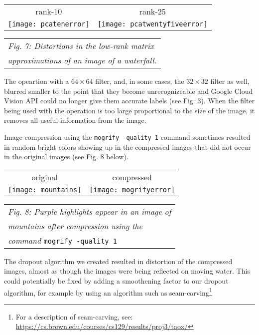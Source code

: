 \documentclass[letterpaper, 12 pt, conference]{ieeeconf}  %
\begin{document}
\begin{tabular}{c c}
	rank-10 & rank-25 \\
	\texttt{[image: pcatenerror]} &
		\texttt{[image: pcatwentyfiveerror]} \\
\end{tabular}
\begin{tabular}{l}
	\hspace*{4mm} {\it Fig. 7: Distortions in the low-rank matrix } \\
	\hspace*{4mm} {\it approximations of an image of a waterfall.} \\
\end{tabular}
\vspace*{3mm}

The  opeartion with a $64 \times 64$ filter,
and, in some cases, the $32 \times 32$ filter as well,
blurred smaller to the point that they become unrecognizeable and
Google Cloud Vision API could no longer give them accurate labels (see
Fig. 3). When the filter being used with the 
operation is too large proportional to the size of the image, it
removes all useful information from the image.

Image compression using the {\tt mogrify -quality 1} command
sometimes resulted in random bright colors showing up in the compressed
images that did not occur in the original images (see Fig. 8 below).

\vspace*{3mm}
\begin{tabular}{c c}
	original & compressed \\
	\texttt{[image: mountains]} &
		\texttt{[image: mogrifyerror]} \\
\end{tabular}
\begin{tabular}{l}
	\hspace*{4mm} {\it Fig. 8: Purple highlights appear in an image of } \\
	\hspace*{4mm} {\it mountains after compression using the } \\
	\hspace*{4mm} {\it command} {\tt mogrify -quality 1} \\
\end{tabular}
\vspace*{3mm}

The dropout algorithm we created resulted in distortion of
the compressed images, almost as though the images
were being reflected on moving water.
This could potentially be fixed by adding a smoothening
factor to our dropout algorithm, for example by
using an algorithm such as seam-carving\footnote{For a description
of seam-carving, see: \url{https://cs.brown.edu/courses/cs129/results/proj3/taox/}}
\end{document}
